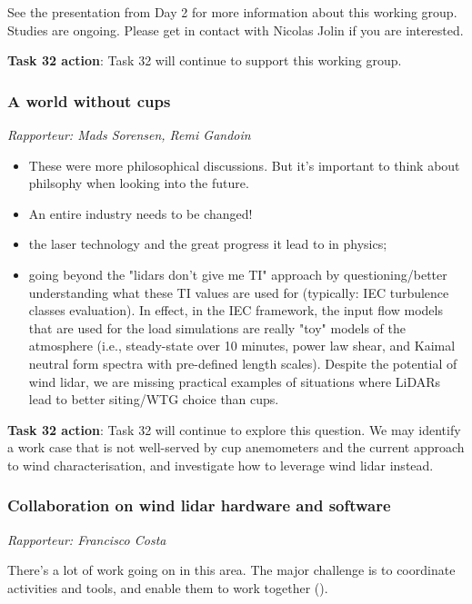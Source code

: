 See the presentation from Day 2 for more information about this working group. Studies are ongoing. Please get in contact with Nicolas Jolin if you are interested.

\textbf{Task 32 action}: Task 32 will continue to support this working group.

\subsubsection{A world without cups}

\emph{Rapporteur: Mads Sorensen, Remi Gandoin}

\begin{itemize}
\item These were more philosophical discussions. But it's important to think about philsophy when looking into the future.
\item An entire industry needs to be changed!
\item the laser technology and the great progress it lead to in physics;
\item going beyond the "lidars don't give me TI" approach by   questioning/better understanding what these TI values are used for (typically: IEC turbulence classes evaluation). In effect, in the IEC framework, the input flow models that are used for the load simulations are really "toy" models of the atmosphere (i.e., steady-state over 10 minutes, power law shear, and Kaimal neutral form spectra with pre-defined length scales). Despite the potential of wind lidar, we are missing practical examples of situations where LiDARs lead to better siting/WTG choice than cups.
\end{itemize}

\textbf{Task 32 action}: Task 32 will continue to explore this question. We may identify a work case that is not well-served by cup anemometers and the current approach to wind characterisation, and investigate how to leverage wind lidar instead.

\subsubsection{Collaboration on wind lidar hardware and software}

\emph{Rapporteur: Francisco Costa}

There's a lot of work going on in this area. The major challenge is to coordinate activities and tools, and enable them to work together ().

